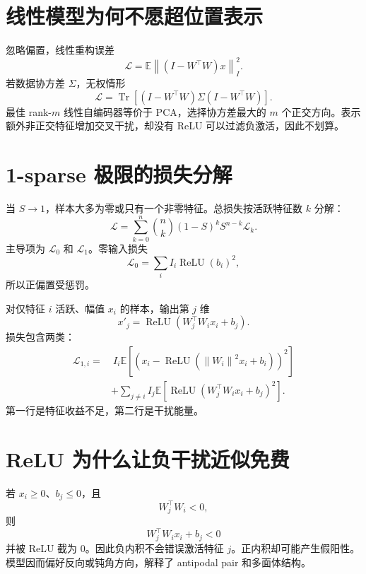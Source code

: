 \documentclass[UTF8,12pt,a4paper,fontset=none]{ctexart}
\numberwithin{equation}{section}
\newcommand{\E}{\mathbb{E}}
\newcommand{\Loss}{\mathcal{L}}
\newcommand{\norm}[1]{\left\lVert #1\right\rVert}
\newcommand{\tr}{\operatorname{Tr}}
\begin{document}
\section{线性模型为何不愿超位置表示}
忽略偏置，线性重构误差
\begin{equation}
 \Loss=\E\norm{(I-W^\top W)x}_I^2.
\end{equation}
若数据协方差 $\Sigma$，无权情形
\begin{equation}
 \Loss=\tr[(I-W^\top W)\Sigma(I-W^\top W)].
\end{equation}
最佳 rank-$m$ 线性自编码器等价于 PCA，选择协方差最大的 $m$ 个正交方向。表示额外非正交特征增加交叉干扰，却没有 ReLU 可以过滤负激活，因此不划算。

\section{1-sparse 极限的损失分解}
当 $S\to1$，样本大多为零或只有一个非零特征。总损失按活跃特征数 $k$ 分解：
\begin{equation}
 \Loss=\sum_{k=0}^{n}\binom{n}{k}(1-S)^kS^{n-k}\Loss_k.
\end{equation}
主导项为 $\Loss_0$ 和 $\Loss_1$。零输入损失
\begin{equation}
 \Loss_0=\sum_iI_i\operatorname{ReLU}(b_i)^2,
\end{equation}
所以正偏置受惩罚。

对仅特征 $i$ 活跃、幅值 $x_i$ 的样本，输出第 $j$ 维
\begin{equation}
 x'_j=\operatorname{ReLU}(W_j^\top W_i x_i+b_j).
\end{equation}
损失包含两类：
\begin{align}
 \Loss_{1,i}=&\ I_i\E[(x_i-\operatorname{ReLU}(\norm{W_i}^2x_i+b_i))^2]\\
 &+\sum_{j\ne i}I_j\E[\operatorname{ReLU}(W_j^\top W_i x_i+b_j)^2].
\end{align}
第一行是特征收益不足，第二行是干扰能量。

\section{ReLU 为什么让负干扰近似免费}
若 $x_i\ge0$、$b_j\le0$，且
\begin{equation}
 W_j^\top W_i<0,
\end{equation}
则
\begin{equation}
 W_j^\top W_i x_i+b_j<0
\end{equation}
并被 ReLU 截为 0。因此负内积不会错误激活特征 $j$。正内积却可能产生假阳性。模型因而偏好反向或钝角方向，解释了 antipodal pair 和多面体结构。
\end{document}
